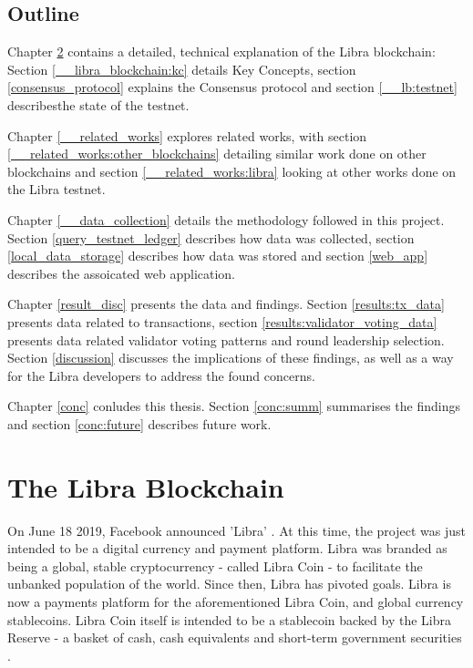 \documentclass[12pt,openany,a4paper]{book}
\begin{document}
\section{Outline}

Chapter \ref{__libra_blockchain} contains a detailed, technical explanation of the Libra blockchain:
Section \ref{__libra_blockchain:kc} details Key Concepts, section \ref{consensus_protocol} 
explains the Consensus protocol and section \ref{__lb:testnet} describesthe state of the testnet. 

Chapter \ref{__related_works} explores related works, with section \ref{__related_works:other_blockchains} 
detailing similar work done on other blockchains and section \ref{__related_works:libra} 
looking at other works done on the Libra testnet.

Chapter \ref{__data_collection} details the methodology followed in this project.
Section \ref{query_testnet_ledger} describes how data was collected, 
section \ref{local_data_storage} describes how data was stored and 
section \ref{web_app} describes the assoicated web application.

Chapter \ref{result_disc} presents the data and findings.
Section \ref{results:tx_data} presents data related to transactions,
section \ref{results:validator_voting_data} presents data related validator 
voting patterns and round leadership selection.
Section \ref{discussion} discusses the implications of these findings, as 
well as a way for the Libra developers to address the found concerns.

Chapter \ref{conc} conludes this thesis.
Section \ref{conc:summ} summarises the findings and 
section \ref{conc:future} describes future work.



\chapter{The Libra Blockchain}
\label{__libra_blockchain}
On June 18 2019, Facebook announced 'Libra' \cite{isaac_popper_2019}.
At this time, the project was just intended to be a digital currency and payment platform. Libra was branded as 
being a global, stable cryptocurrency - called Libra Coin - to facilitate the unbanked population of 
the world. \cite{libra_path_forward} Since then, Libra has pivoted goals. Libra 
is now a payments platform for the aforementioned Libra Coin, and global currency
stablecoins. Libra Coin itself is intended to be a stablecoin 
backed by the Libra Reserve - a basket of cash, cash equivalents and short-term 
government securities \cite{libra_whitepaper}.
\end{document}
